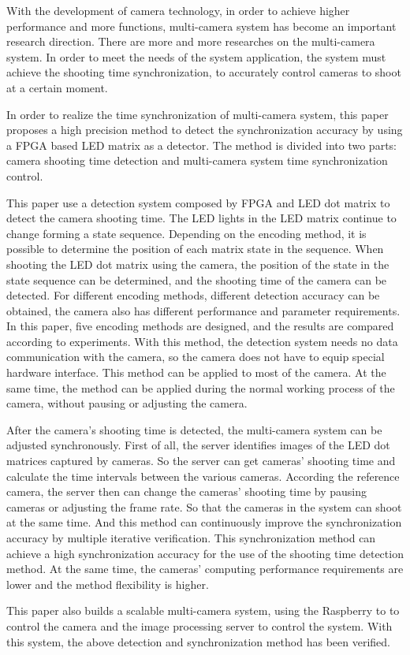 \begin{eabstract}

With the development of camera technology, in order to achieve higher performance and more functions, multi-camera system has become an important research direction. There are more and more researches on the multi-camera system. In order to meet the needs of the system application, the system must achieve the shooting time synchronization, to accurately control cameras to shoot at a certain moment.

In order to realize the time synchronization of multi-camera system, this paper proposes a high precision method to detect the synchronization accuracy by using a FPGA based LED matrix as a detector. The method is divided into two parts: camera shooting time detection and multi-camera system time synchronization control.

This paper use a detection system composed by FPGA and LED dot matrix to detect the camera shooting time. The LED lights in the LED matrix continue to change forming a state sequence. Depending on the encoding method, it is possible to determine the position of each matrix state in the sequence. When shooting the LED dot matrix using the camera, the position of the state in the state sequence can be determined, and the shooting time of the camera can be detected. For different encoding methods, different detection accuracy can be obtained, the camera also has different performance and parameter requirements. In this paper, five encoding methods are designed, and the results are compared according to experiments. With this method, the detection system needs no data communication with the camera, so the camera does not have to equip special hardware interface. This method can be applied to most of the camera. At the same time, the method can be applied during the normal working process of the camera, without pausing or adjusting the camera.

After the camera's shooting time is detected, the multi-camera system can be adjusted synchronously. First of all, the server identifies images of the LED dot matrices captured by cameras. So the server can get cameras' shooting time and calculate the time intervals between the various cameras. According the reference camera, the server then can change the cameras' shooting time by pausing cameras or adjusting the frame rate. So that the cameras in the system can shoot at the same time. And this method can continuously improve the synchronization accuracy by multiple iterative verification. This synchronization method can achieve a high synchronization accuracy for the use of the shooting time detection method. At the same time, the cameras' computing performance requirements are lower and the method flexibility is higher.

This paper also builds a scalable multi-camera system, using the Raspberry to to control the camera and the image processing server to control the system. With this system, the above detection and synchronization method has been verified.

\end{eabstract}

